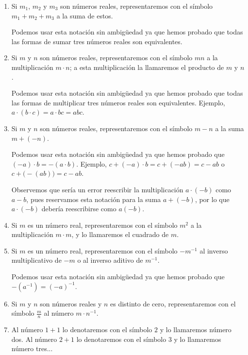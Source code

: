 \documentclass[11pt]{article}
\begin{document}
    \begin{enumerate}[label=\roman*)]
    \item Si $m_1$, $m_2$ y $m_3$ son números reales, representaremos con el símbolo $m_1+m_2+ m_3$ a la suma de estos.
    
    Podemos usar esta notación sin ambigüedad ya que hemos probado que todas las formas de sumar tres números reales son equivalentes.

    \item Si $m$ y $n$ son números reales, representaremos con el símbolo $mn$ a la multiplicación $m\cdot n$; a esta multiplicación la llamaremos el producto de $m$ y $n$.
    
    Podemos usar esta notación sin ambigüedad ya que hemos probado que todas las formas de multiplicar tres números reales son equivalentes. Ejemplo, $a\cdot (b\cdot c)= a\cdot bc=abc$.

    \item Si $m$ y $n$ son números reales, representaremos con el símbolo $m-n$ a la suma $m+ (-n)$.
    
    Podemos usar esta notación sin ambigüedad ya que hemos probado que $(-a)\cdot b = -(a \cdot b)$. Ejemplo, $c+(-a)\cdot b=c+(-ab)=c-ab$ o $c+\bigl(-(ab)\bigr)=c-ab$.

    Observemos que sería un error reescribir la multiplicación $a\cdot (-b)$ como $a-b$, pues reservamos esta notación para la suma $a+(-b)$, por lo que $a\cdot (-b)$ debería reescribirse como $a(-b)$.

    \item Si $m$ es un número real, representaremos con el símbolo $m^2$ a la multiplicación $m\cdot m$, y lo llamaremos el cuadrado de $m$.
    
    \item Si $m$ es un número real, representaremos con el símbolo $-m^{-1}$ al inverso multiplicativo de $-m$ o al inverso aditivo de $m^{-1}$.
        
    Podemos usar esta notación sin ambigüedad ya que hemos probado que $-(a^{-1})=(-a)^{-1}$.
    
    \item Si $m$ y $n$ son números reales y $n$ es distinto de cero, representaremos con el símbolo $ \frac{m}{n}$ al número $m \cdot n^{-1} $.
    
    \item Al número $1+1$ lo denotaremos con el símbolo $2$ y lo llamaremos número dos. Al número $2+1$ lo denotaremos con el símbolo $3$ y lo llamaremos número tres...
    \end{enumerate}
\end{document}
